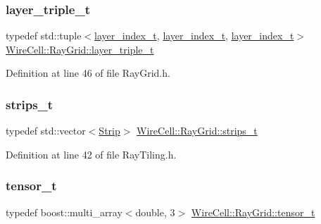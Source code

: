 \subsubsection{\texorpdfstring{layer\+\_\+triple\+\_\+t}{layer\_triple\_t}}
{\footnotesize\ttfamily typedef std\+::tuple$<$\hyperlink{namespace_wire_cell_1_1_ray_grid_ab7562e54b58eede813d5b70b5eb85812}{layer\+\_\+index\+\_\+t}, \hyperlink{namespace_wire_cell_1_1_ray_grid_ab7562e54b58eede813d5b70b5eb85812}{layer\+\_\+index\+\_\+t}, \hyperlink{namespace_wire_cell_1_1_ray_grid_ab7562e54b58eede813d5b70b5eb85812}{layer\+\_\+index\+\_\+t}$>$ \hyperlink{namespace_wire_cell_1_1_ray_grid_a4a0ec28f63c71de061dcc8ca912f8437}{Wire\+Cell\+::\+Ray\+Grid\+::layer\+\_\+triple\+\_\+t}}



Definition at line 46 of file Ray\+Grid.\+h.

\mbox{\label{namespace_wire_cell_1_1_ray_grid_a06c9ce08c0358d22fae3185aff8a9b7c}} 
\subsubsection{\texorpdfstring{strips\+\_\+t}{strips\_t}}
{\footnotesize\ttfamily typedef std\+::vector$<$\hyperlink{struct_wire_cell_1_1_ray_grid_1_1_strip}{Strip}$>$ \hyperlink{namespace_wire_cell_1_1_ray_grid_a06c9ce08c0358d22fae3185aff8a9b7c}{Wire\+Cell\+::\+Ray\+Grid\+::strips\+\_\+t}}



Definition at line 42 of file Ray\+Tiling.\+h.

\mbox{\label{namespace_wire_cell_1_1_ray_grid_adaca791d3ebd5f5c455aa89966289111}} 
\subsubsection{\texorpdfstring{tensor\+\_\+t}{tensor\_t}}
{\footnotesize\ttfamily typedef boost\+::multi\+\_\+array$<$double, 3$>$ \hyperlink{namespace_wire_cell_1_1_ray_grid_adaca791d3ebd5f5c455aa89966289111}{Wire\+Cell\+::\+Ray\+Grid\+::tensor\+\_\+t}}



